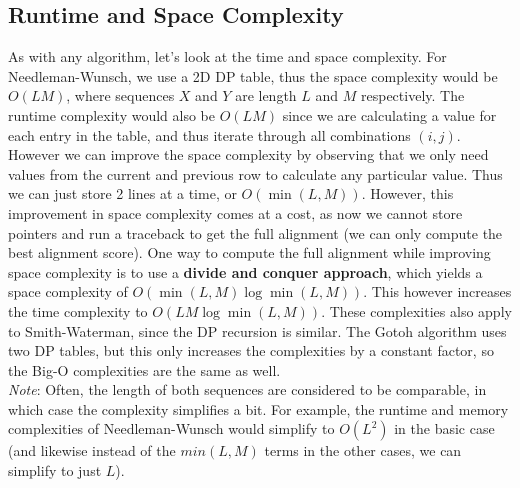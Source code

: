 \documentclass[12pt]{article}
\begin{document}
\subsection{Runtime and Space Complexity}
As with any algorithm, let's look at the time and space complexity. For Needleman-Wunsch, we use a 2D DP table, thus the space complexity would be $O(LM)$, where sequences $X$ and $Y$ are length $L$ and $M$ respectively. The runtime complexity would also be $O(LM)$ since we are calculating a value for each entry in the table, and thus iterate through all combinations $(i,j)$. However we can improve the space complexity by observing that we only need values from the current and previous row to calculate any particular value. Thus we can just store 2 lines at a time, or $O(\min (L,M))$. However, this improvement in space complexity comes at a cost, as now we cannot store pointers and run a traceback to get the full alignment (we can only compute the best alignment score). One way to compute the full alignment while improving space complexity is to use a \textbf{divide and conquer approach}, which yields a space complexity of $O(\min(L,M)\log \min(L,M))$. This however increases the time complexity to $O(LM\log \min(L,M))$. These complexities also apply to Smith-Waterman, since the DP recursion is similar. The Gotoh algorithm uses two DP tables, but this only increases the complexities by a constant factor, so the Big-O complexities are the same as well.\\[10pt]
\textit{Note}: Often, the length of both sequences are considered to be comparable, in which case the complexity simplifies a bit. For example, the runtime and memory complexities of Needleman-Wunsch would simplify to $O(L^2)$ in the basic case (and likewise instead of the $min(L,M)$ terms in the other cases, we can simplify to just $L$).
\end{document}
